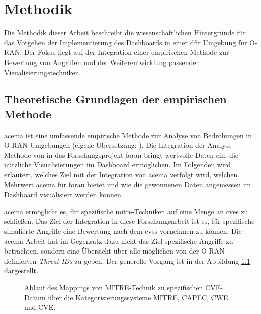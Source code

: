 \chapter{Methodik}
\label{chap:methodik}
Die Methodik dieser Arbeit beschreibt die wissenschaftlichen Hintergründe für das Vorgehen der Implementierung des Dashboards in einer \gls{dfir} Umgebung für O-RAN. Der Fokus liegt auf der Integration einer empirischen Methode zur Bewertung von Angriffen und der Weiterentwicklung passender Visualisierungstechniken.
\section{Theoretische Grundlagen der empirischen Methode}
\label{sec:auswahlDerEmpirischenMethode}
\gls{acema} ist \glqq{}eine umfassende empirische Methode zur Analyse von Bedrohungen in O-RAN Umgebungen\grqq{} (eigene Übersetzung: \autocite{klementSecuring6GTransition2024}). Die Integration der Analyse-Methode von \citeauthor{klementSecuring6GTransition2024} in das Forschungsprojekt \gls{foran} bringt wertvolle Daten ein, die nützliche Visualisierungen im Dashboard ermöglichen. Im Folgenden wird erläutert, welches Ziel mit der Integration von \gls{acema} verfolgt wird, welchen Mehrwert \gls{acema} für \gls{foran} bietet und wie die gewonnenen Daten angemessen im Dashboard visualisiert werden können.
\par \gls{acema} ermöglicht es, für spezifische \gls{mitre}-Techniken auf eine Menge an \glspl{cve} zu schließen. Das Ziel der Integration in diese Forschungsarbeit ist es, für spezifische simulierte Angriffe eine Bewertung nach dem \gls{cvss} vornehmen zu können. Die \gls{acema}-Arbeit hat im Gegensatz dazu nicht das Ziel spezifische Angriffe zu betrachten, sondern eine Übersicht über alle möglichen von der O-RAN definierten \textit{Threat-IDs} zu geben. Der generelle Vorgang ist in der Abbildung \ref{fig:mitre_mapping} dargestellt.

%
\begin{figure}
    \centering
    \caption{Ablauf des Mappings von MITRE-Technik zu spezifischen CVE-Datum über die Kategorisierungssysteme MITRE, CAPEC, CWE und CVE.}
    \label{fig:mitre_mapping}
\end{figure}

